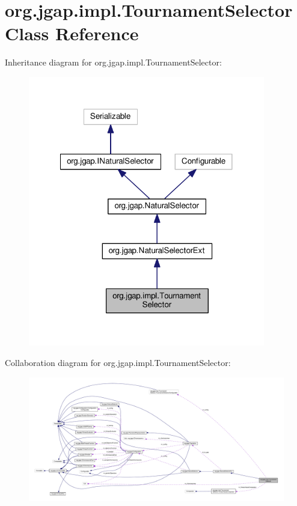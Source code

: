 \hypertarget{classorg_1_1jgap_1_1impl_1_1_tournament_selector}{\section{org.\-jgap.\-impl.\-Tournament\-Selector Class Reference}
\label{classorg_1_1jgap_1_1impl_1_1_tournament_selector}
}


Inheritance diagram for org.\-jgap.\-impl.\-Tournament\-Selector\-:
\nopagebreak
\begin{figure}[H]
\begin{center}
\leavevmode
\includegraphics[width=293pt]{classorg_1_1jgap_1_1impl_1_1_tournament_selector__inherit__graph}
\end{center}
\end{figure}


Collaboration diagram for org.\-jgap.\-impl.\-Tournament\-Selector\-:
\nopagebreak
\begin{figure}[H]
\begin{center}
\leavevmode
\includegraphics[width=350pt]{classorg_1_1jgap_1_1impl_1_1_tournament_selector__coll__graph}
\end{center}
\end{figure}
